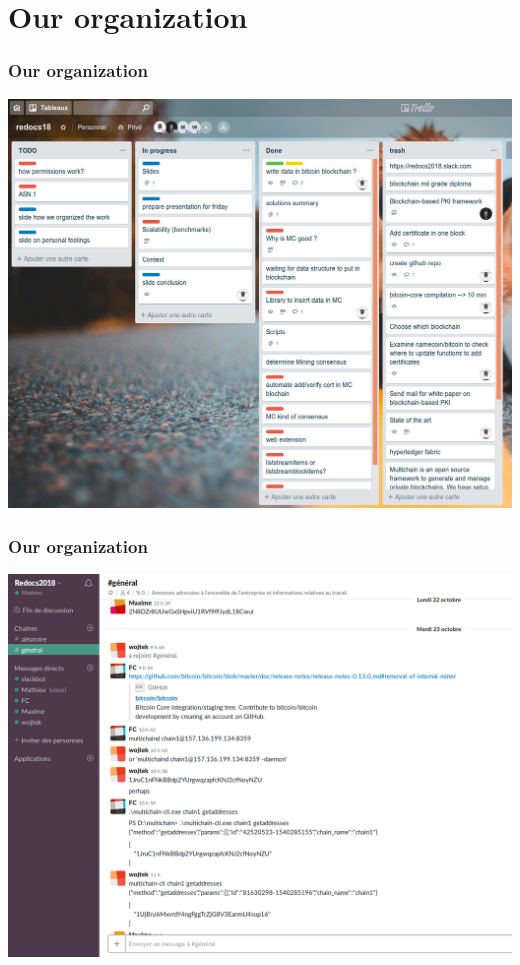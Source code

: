 \section[Our organization]{Our organization}
\begin{frame}
	\frametitle{Our organization}
	\includegraphics[scale=0.4]{figs/trello.jpg}
\end{frame}

\begin{frame}
	\frametitle{Our organization}
	\includegraphics[scale=0.4]{figs/slack.png}
\end{frame}

